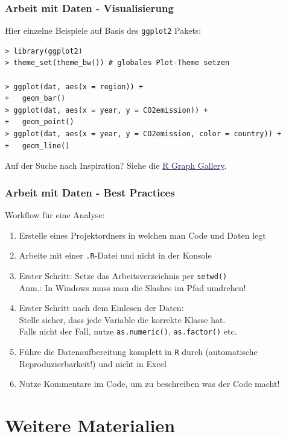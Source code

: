\documentclass[xcolor=dvipsnames,class=article,a4paper]{beamer}
\begin{document}
\begin{frame}[fragile]
\frametitle{Arbeit mit Daten - Visualisierung}
Hier einzelne Beispiele auf Basis des \texttt{ggplot2} Pakets:
\begin{lstlisting}
> library(ggplot2)
> theme_set(theme_bw()) # globales Plot-Theme setzen

> ggplot(dat, aes(x = region)) + 
+   geom_bar()
> ggplot(dat, aes(x = year, y = CO2emission)) +
+   geom_point()
> ggplot(dat, aes(x = year, y = CO2emission, color = country)) +
+   geom_line()
\end{lstlisting}
\bigskip \bigskip
Auf der Suche nach Inspiration? Siehe die \href{http://www.r-graph-gallery.com/}{\textcolor{MidnightBlue}{R Graph Gallery}}.
\end{frame}

\begin{frame}
\frametitle{Arbeit mit Daten - Best Practices}
Workflow für eine Analyse:
\begin{enumerate}
  \item Erstelle eines Projektordners in welchen man Code und Daten legt
  \item Arbeite mit einer \texttt{.R}-Datei und nicht in der Konsole
  \item Erster Schritt: Setze das Arbeitsverzeichnis per \texttt{setwd()} \\ {\tiny Anm.: In Windows muss man die Slashes im Pfad umdrehen!}
  \item Erster Schritt nach dem Einlesen der Daten: \\ Stelle sicher, dass jede Variable die korrekte Klasse hat. \\ Falls nicht der Fall, nutze \texttt{as.numeric()}, \texttt{as.factor()} etc.
  \item Führe die Datenaufbereitung komplett in \texttt{R} durch (automatische Reproduzierbarkeit!) und nicht in Excel
  \item Nutze Kommentare im Code, um zu beschreiben was der Code macht!
\end{enumerate}
\end{frame}



\section{Weitere Materialien}
\addtocounter{framenumber}{-1}
\end{document}
